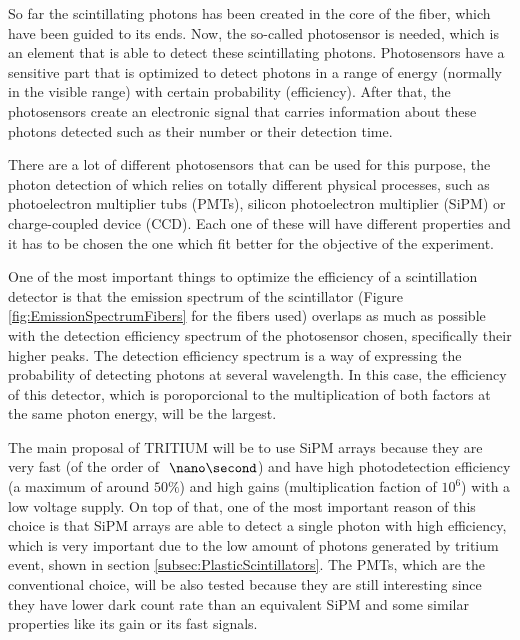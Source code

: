 So far the scintillating photons has been created in the core of the fiber, which have been guided to its ends. Now, the so-called photosensor is needed, which is an element that is able to detect these scintillating photons. Photosensors have a sensitive part that is optimized to detect photons in a range of energy (normally in the visible range) with certain probability (efficiency). After that, the photosensors create an electronic signal that carries information about these photons detected such as their number or their detection time.

There are a lot of different photosensors that can be used for this purpose, the photon detection of which relies on totally different physical processes, such as photoelectron multiplier tubs (PMTs), silicon photoelectron multiplier (SiPM) or charge-coupled device (CCD).  Each one of these will have different properties and it has to be chosen the one which fit better for the objective of the experiment.

One of the most important things to optimize the efficiency of a scintillation detector is that the emission spectrum of the scintillator (Figure \ref{fig:EmissionSpectrumFibers} for the fibers used) overlaps as much as possible with the detection efficiency spectrum of the photosensor chosen, specifically their higher peaks. The detection efficiency spectrum is a way of expressing the probability of detecting photons at several wavelength. In this case, the efficiency of this detector,  which is poroporcional to the multiplication of both factors at the same photon energy, will be the largest.

The main proposal of TRITIUM will be to use SiPM arrays because they are very fast (of the order of $~\nano\second$) and have high photodetection efficiency (a maximum of around $50\%$) and high gains (multiplication faction of $10^{6}$) with a low voltage supply. On top of that, one of the most important reason of this choice is that SiPM arrays are able to detect a single photon with high efficiency, which is very important due to the low amount of photons generated by tritium event, shown in section \ref{subsec:PlasticScintillators}. The PMTs, which are the conventional choice, will be also tested because they are still interesting since they have lower dark count rate than an equivalent SiPM and some similar properties like its gain or its fast signals.




